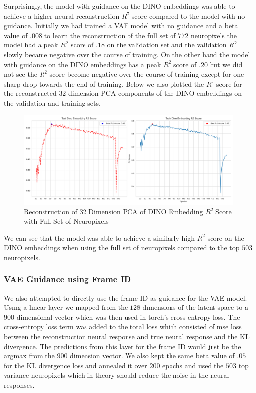 \documentclass[12pt, letterpaper]{article}
\begin{document}
Surprisingly, the model with guidance on the DINO \cite{dino} embeddings was able to achieve a higher neural reconstruction $R^2$ score compared to the model with no guidance. Initially we had trained a VAE model with no guidance and a beta value of $.008$ to learn the reconstruction of the full set of $772$ neuropixels the model had a peak $R^2$ score of $.18$ on the validation set and the validation $R^2$ slowly became negative over the course of training. On the other hand the model with guidance on the DINO \cite{dino} embeddings has a peak $R^2$ score of $.20$ but we did not see the $R^2$ score become negative over the course of training except for one sharp drop towards the end of training. Below we also plotted the $R^2$ score for the reconstructed $32$ dimension PCA components of the DINO \cite{dino} embeddings on the validation and training sets.

\begin{figure}[H]
    \centering
    \includegraphics[width=.9\textwidth]{.9_pca_DINO_embed_r2_128dim_772_top_var_200_epochs_0.008_beta_2_layer.png}
    \caption{Reconstruction of $32$ Dimension PCA of DINO Embedding $R^2$ Score with Full Set of Neuropixels}
    \label{fig:vae_guidance_DINO_pca_DINO_embed_r2_full_neuropixels}
\end{figure}

We can see that the model was able to achieve a similarly high $R^2$ score on the DINO \cite{dino} embeddings when using the full set of neuropixels compared to the top $503$ neuropixels. 

\subsubsection{VAE Guidance using Frame ID}
\label{subsubsec:vae_guidance_frame_id}
We also attempted to directly use the frame ID as guidance for the VAE model. Using a linear layer we mapped from the $128$ dimensions of the latent space to a $900$ dimensional vector which was then used in torch's cross-entropy loss. The cross-entropy loss term was added to the total loss which consisted of mse loss between the reconstruction neural response and true neural response and the KL divergence. The predictions from this layer for the frame ID would just be the argmax from the $900$ dimension vector. We also kept the same beta value of $.05$ for the KL divergence loss and annealed it over $200$ epochs and used the $503$ top variance neuropixels which in theory should reduce the noise in the neural responses.
\end{document}
